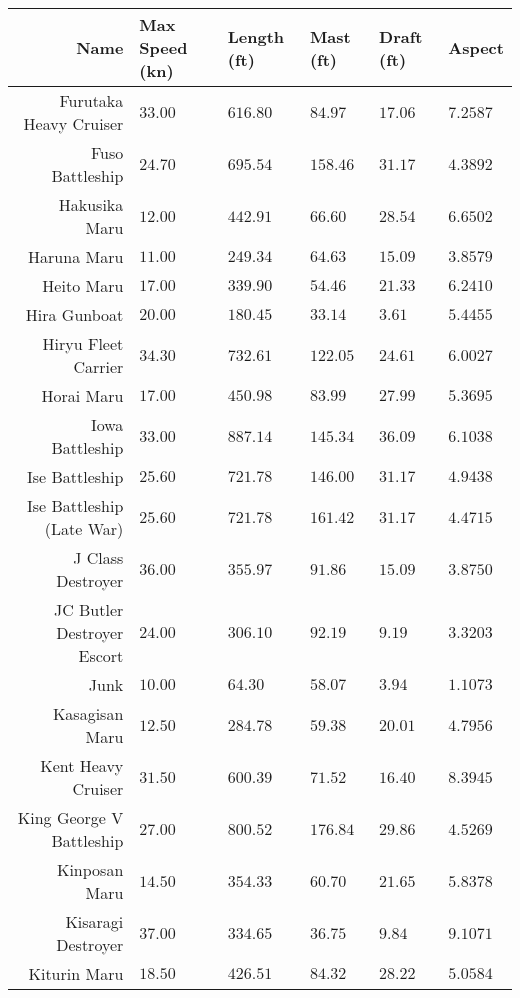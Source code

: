 \documentclass{article}
\begin{document}
\pagebreak
\begin{tabularx}{\textwidth}{|r|l|l|X|X|X|}
\hline
Name & Max Speed (kn) & Length (ft) & Mast (ft) & Draft (ft) & Aspect\\
\hline
Furutaka Heavy Cruiser & $33.00$ & $616.80$ & $84.97$ & $17.06$ & $7.2587$ \\
\hline
Fuso Battleship & $24.70$ & $695.54$ & $158.46$ & $31.17$ & $4.3892$ \\
\hline
Hakusika Maru & $12.00$ & $442.91$ & $66.60$ & $28.54$ & $6.6502$ \\
\hline
Haruna Maru & $11.00$ & $249.34$ & $64.63$ & $15.09$ & $3.8579$ \\
\hline
Heito Maru & $17.00$ & $339.90$ & $54.46$ & $21.33$ & $6.2410$ \\
\hline
Hira Gunboat & $20.00$ & $180.45$ & $33.14$ & $3.61$ & $5.4455$ \\
\hline
Hiryu Fleet Carrier & $34.30$ & $732.61$ & $122.05$ & $24.61$ & $6.0027$ \\
\hline
Horai Maru & $17.00$ & $450.98$ & $83.99$ & $27.99$ & $5.3695$ \\
\hline
Iowa Battleship & $33.00$ & $887.14$ & $145.34$ & $36.09$ & $6.1038$ \\
\hline
Ise Battleship & $25.60$ & $721.78$ & $146.00$ & $31.17$ & $4.9438$ \\
\hline
Ise Battleship (Late War) & $25.60$ & $721.78$ & $161.42$ & $31.17$ & $4.4715$ \\
\hline
J Class Destroyer & $36.00$ & $355.97$ & $91.86$ & $15.09$ & $3.8750$ \\
\hline
JC Butler Destroyer Escort & $24.00$ & $306.10$ & $92.19$ & $9.19$ & $3.3203$ \\
\hline
Junk & $10.00$ & $64.30$ & $58.07$ & $3.94$ & $1.1073$ \\
\hline
Kasagisan Maru & $12.50$ & $284.78$ & $59.38$ & $20.01$ & $4.7956$ \\
\hline
Kent Heavy Cruiser & $31.50$ & $600.39$ & $71.52$ & $16.40$ & $8.3945$ \\
\hline
King George V Battleship & $27.00$ & $800.52$ & $176.84$ & $29.86$ & $4.5269$ \\
\hline
Kinposan Maru & $14.50$ & $354.33$ & $60.70$ & $21.65$ & $5.8378$ \\
\hline
Kisaragi Destroyer & $37.00$ & $334.65$ & $36.75$ & $9.84$ & $9.1071$ \\
\hline
Kiturin Maru & $18.50$ & $426.51$ & $84.32$ & $28.22$ & $5.0584$ \\
\hline
\end{tabularx}
\pagebreak
\end{document}
